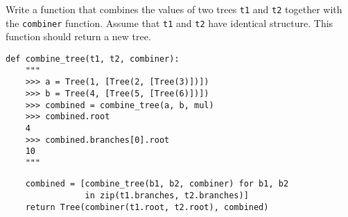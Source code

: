 \question Write a function that combines the values of two
trees \texttt{t1} and \texttt{t2} together with the \texttt{combiner}
function. Assume that \texttt{t1} and \texttt{t2} have identical structure. This function should return a new tree.
\begin{lstlisting}
def combine_tree(t1, t2, combiner):
    """
    >>> a = Tree(1, [Tree(2, [Tree(3)])])
    >>> b = Tree(4, [Tree(5, [Tree(6)])])
    >>> combined = combine_tree(a, b, mul)
    >>> combined.root
    4
    >>> combined.branches[0].root
    10
    """
\end{lstlisting}
\begin{solution}[1in]
\begin{lstlisting}
    combined = [combine_tree(b1, b2, combiner) for b1, b2
                in zip(t1.branches, t2.branches)]
    return Tree(combiner(t1.root, t2.root), combined)
\end{lstlisting}
\end{solution}
